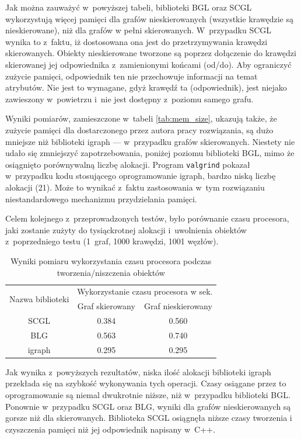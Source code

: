 \documentclass[a4paper,12pt,polish,twoside,openright]{thesis}
\newcommand\code[1]{\lstinline[style=line]{#1}}
\begin{document}
Jak można zauważyć w~powyższej tabeli, biblioteki BGL oraz SCGL wykorzystują więcej pamięci dla grafów nieskierowanych (wszystkie krawędzie są nieskierowane), niż dla grafów w pełni skierowanych.
W~przypadku SCGL wynika to z~faktu, iż dostosowana ona jest do przetrzymywania krawędzi skierowanych.
Obiekty nieskierowane tworzone są poprzez dołączenie do krawędzi skierowanej jej odpowiednika z~zamienionymi końcami (od/do).
Aby ograniczyć zużycie pamięci, odpowiednik ten nie przechowuje informacji na temat atrybutów.
Nie jest to wymagane, gdyż krawędź ta (odpowiednik), jest niejako zawieszony w~powietrzu i~nie jest dostępny z~poziomu samego grafu.

Wyniki pomiarów, zamieszczone w~tabeli \ref{tab:mem_size}, ukazują także, że zużycie pamięci dla dostarczonego przez autora pracy rozwiązania, są dużo mniejsze niż biblioteki igraph --- w~przypadku grafów skierowanych.
Niestety nie udało się zmniejszyć zapotrzebowania, poniżej poziomu biblioteki BGL, mimo że osiągnięto porównywalną liczbę alokacji.
Program \code{valgrind} pokazał w~przypadku kodu stosującego oprogramowanie igraph, bardzo niską liczbę alokacji (21).
Może to wynikać z~faktu zastosowania w~tym rozwiązaniu niestandardowego mechanizmu przydzielania pamięci.

Celem kolejnego z~przeprowadzonych testów, było porównanie czasu procesora, jaki zostanie zużyty do tysiąckrotnej alokacji i~uwolnienia obiektów z~poprzedniego testu (1~graf, 1000 krawędzi, 1001 węzłów).
\begin{table}[htb]
\caption{Wyniki pomiaru wykorzystania czasu procesora podczas tworzenia/niszczenia obiektów}
\label{tab:mem_speed}
\centering
\begin{tabular}{ | c | c | c | }
	\hline
	\multirow{2}{*}{Nazwa biblioteki } & \multicolumn{2}{|c|}{Wykorzystanie czasu procesora w sek.} \\
	\cline{2-3}
		& Graf skierowany & Graf nieskierowany \\
	\hline \hline
	SCGL    & 0.384 & 0.560 \\ \hline
	BLG     & 0.563 & 0.740 \\ \hline
	igraph  & 0.295 & 0.295 \\ \hline
\end{tabular}
\end{table}

Jak wynika z~powyższych rezultatów, niska ilość alokacji biblioteki igraph przekłada się na szybkość wykonywania tych operacji.
Czasy osiągane przez to oprogramowanie są niemal dwukrotnie niższe, niż w~przypadku biblioteki BGL.
Ponownie w~przypadku SCGL oraz BLG, wyniki dla grafów nieskierowanych są gorsze niż dla skierowanych.
Biblioteka SCGL osiągnęła niższe czasy tworzenia i czyszczenia pamięci niż jej odpowiednik napisany w~C++.
\end{document}
